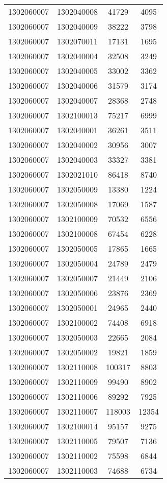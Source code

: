 \begin{longtable}[h]{llcc}
		1302060007 & 1302040008 & 41729 & 4095\\
		1302060007 & 1302040009 & 38222 & 3798\\
		1302060007 & 1302070011 & 17131 & 1695\\
		1302060007 & 1302040004 & 32508 & 3249\\
		1302060007 & 1302040005 & 33002 & 3362\\
		1302060007 & 1302040006 & 31579 & 3174\\
		1302060007 & 1302040007 & 28368 & 2748\\
		1302060007 & 1302100013 & 75217 & 6999\\
		1302060007 & 1302040001 & 36261 & 3511\\
		1302060007 & 1302040002 & 30956 & 3007\\
		1302060007 & 1302040003 & 33327 & 3381\\
		1302060007 & 1302021010 & 86418 & 8740\\
		1302060007 & 1302050009 & 13380 & 1224\\
		1302060007 & 1302050008 & 17069 & 1587\\
		1302060007 & 1302100009 & 70532 & 6556\\
		1302060007 & 1302100008 & 67454 & 6228\\
		1302060007 & 1302050005 & 17865 & 1665\\
		1302060007 & 1302050004 & 24789 & 2479\\
		1302060007 & 1302050007 & 21449 & 2106\\
		1302060007 & 1302050006 & 23876 & 2369\\
		1302060007 & 1302050001 & 24965 & 2440\\
		1302060007 & 1302100002 & 74408 & 6918\\
		1302060007 & 1302050003 & 22665 & 2084\\
		1302060007 & 1302050002 & 19821 & 1859\\
		1302060007 & 1302110008 & 100317 & 8803\\
		1302060007 & 1302110009 & 99490 & 8902\\
		1302060007 & 1302110006 & 89292 & 7925\\
		1302060007 & 1302110007 & 118003 & 12354\\
		1302060007 & 1302100014 & 95157 & 9275\\
		1302060007 & 1302110005 & 79507 & 7136\\
		1302060007 & 1302110002 & 75598 & 6844\\
		1302060007 & 1302110003 & 74688 & 6734\\

\end{longtable}
